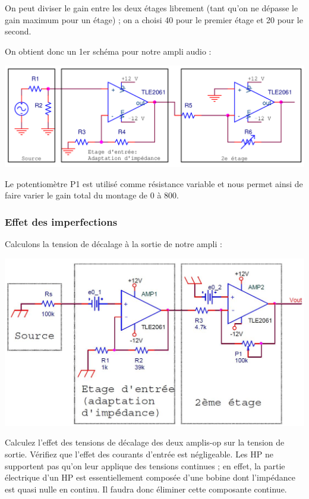 \documentclass{../template/labo}
\begin{document}
On peut diviser le gain entre les deux étages librement (tant qu'on ne dépasse le gain maximum pour un étage) ; on a choisi 40 pour le premier étage et 20 pour le second.

On obtient donc un 1er schéma pour notre ampli audio :
\begin{center}
\includegraphics[width=14cm]{figures/AOP2etages}
\end{center}

Le potentiomètre P1 est utilisé comme résistance variable et nous permet ainsi de faire varier le gain total du montage de 0 à 800.

\subsubsection{Effet des imperfections}
Calculons la tension de décalage à la sortie de notre ampli :
\begin{center}
\includegraphics[width=14cm]{figures/AOPimperfections}
\end{center}
\Question
{
Calculez l'effet des tensions de décalage des deux amplis-op sur la tension de sortie.
}
{}
\Question
{
Vérifiez que l'effet des courants d'entrée est négligeable.
}
{}
Les HP ne supportent pas qu'on leur applique des tensions continues ; en effet, la partie électrique d'un HP est essentiellement composée d'une bobine dont l'impédance est quasi nulle en continu. Il faudra donc éliminer cette composante continue.
\end{document}
